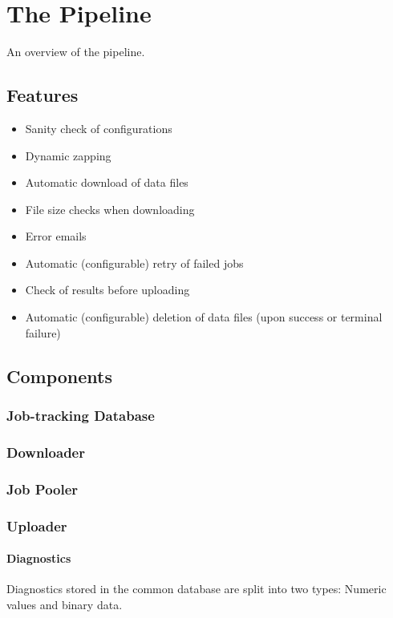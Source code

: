 \section{The Pipeline}
An overview of the pipeline.

\subsection{Features}
\begin{itemize}
    \item Sanity check of configurations
    \item Dynamic zapping
    \item Automatic download of data files
    \item File size checks when downloading
    \item Error emails
    \item Automatic (configurable) retry of failed jobs
    \item Check of results before uploading
    \item Automatic (configurable) deletion of data files (upon success or terminal failure)
\end{itemize}


\subsection{Components}
\subsubsection{Job-tracking Database}
\subsubsection{Downloader}
\subsubsection{Job Pooler}
\subsubsection{Uploader}
\paragraph{Diagnostics}
Diagnostics stored in the common database are split into two types: Numeric values and binary data.

